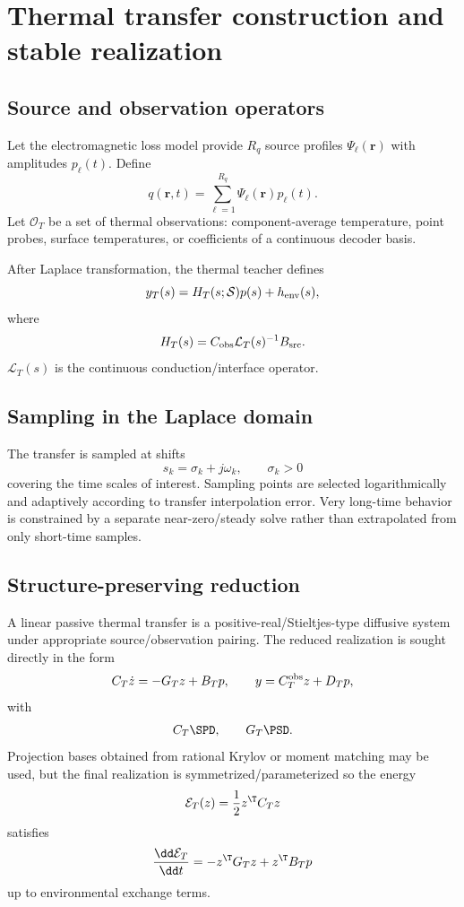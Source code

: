 \section{Thermal transfer construction and stable realization}
\label{sec:thermal-realization}

\subsection{Source and observation operators}

Let the electromagnetic loss model provide $R_q$ source profiles
$\Psi_\ell(\mathbf r)$ with amplitudes $p_\ell(t)$. Define
\[
 q(\mathbf r,t)
 =
 \sum_{\ell=1}^{R_q}\Psi_\ell(\mathbf r)p_\ell(t).
\]
Let $\mathcal O_T$ be a set of thermal observations: component-average
temperature, point probes, surface temperatures, or coefficients of a
continuous decoder basis.

After Laplace transformation, the thermal teacher defines
\[
 y_T(s)=H_T(s;\mathcal S)p(s)+h_{\rm env}(s),
\]
where
\[
 H_T(s)
 =
 C_{\rm obs}
 \mathcal L_T(s)^{-1}
 B_{\rm src}.
\]
$\mathcal L_T(s)$ is the continuous conduction/interface operator.

\subsection{Sampling in the Laplace domain}

The transfer is sampled at shifts
\[
 s_k=\sigma_k+j\omega_k,\qquad \sigma_k>0
\]
covering the time scales of interest. Sampling points are selected
logarithmically and adaptively according to transfer interpolation error. Very
long-time behavior is constrained by a separate near-zero/steady solve rather
than extrapolated from only short-time samples.

\subsection{Structure-preserving reduction}

A linear passive thermal transfer is a positive-real/Stieltjes-type diffusive
system under appropriate source/observation pairing. The reduced realization
is sought directly in the form
\[
 C_T\dot z=-G_Tz+B_Tp,\qquad
 y=C_T^{\rm obs}z+D_Tp,
\]
with
\[
 C_T\SPD,\qquad G_T\PSD.
\]
Projection bases obtained from rational Krylov or moment matching may be used,
but the final realization is symmetrized/parameterized so the energy
\[
 \mathcal E_T(z)=\frac12 z^\T C_Tz
\]
satisfies
\[
 \frac{\dd\mathcal E_T}{\dd t}
 =
 -z^\T G_Tz+z^\T B_Tp
\]
up to environmental exchange terms.

